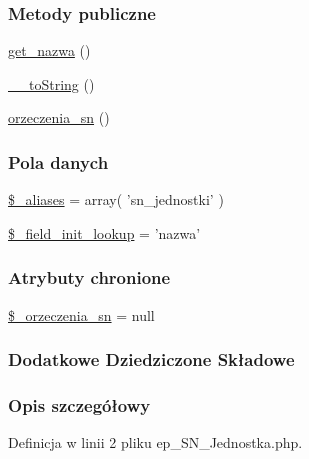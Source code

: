 \subsubsection*{Metody publiczne}
\begin{DoxyCompactItemize}
\item 
\hyperlink{classep___s_n___jednostka_ac0818f0049d7b84f08f77128f54cee36}{get\-\_\-nazwa} ()
\item 
\hyperlink{classep___s_n___jednostka_a7516ca30af0db3cdbf9a7739b48ce91d}{\-\_\-\-\_\-to\-String} ()
\item 
\hyperlink{classep___s_n___jednostka_a1da449088f8d852fb2a7a425e8036b13}{orzeczenia\-\_\-sn} ()
\end{DoxyCompactItemize}
\subsubsection*{Pola danych}
\begin{DoxyCompactItemize}
\item 
\hyperlink{classep___s_n___jednostka_ab4e31d75f0bc5d512456911e5d01366b}{\$\-\_\-aliases} = array( 'sn\-\_\-jednostki' )
\item 
\hyperlink{classep___s_n___jednostka_a4a4d54ae35428077a7c61ec8a5139af3}{\$\-\_\-field\-\_\-init\-\_\-lookup} = 'nazwa'
\end{DoxyCompactItemize}
\subsubsection*{Atrybuty chronione}
\begin{DoxyCompactItemize}
\item 
\hyperlink{classep___s_n___jednostka_a6f02468de85c0d4fa4f284d88f064662}{\$\-\_\-orzeczenia\-\_\-sn} = null
\end{DoxyCompactItemize}
\subsubsection*{Dodatkowe Dziedziczone Składowe}


\subsubsection{Opis szczegółowy}


Definicja w linii 2 pliku ep\-\_\-\-S\-N\-\_\-\-Jednostka.\-php.



